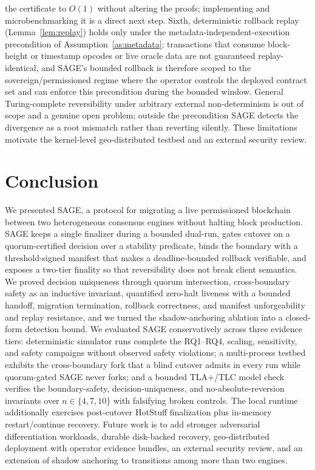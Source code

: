 \documentclass[journal]{IEEEtran}
\theoremstyle{remark}
\begin{document}
the certificate to $O(1)$ without altering the proofs; implementing and microbenchmarking it is a
direct next step. Sixth, deterministic rollback replay (Lemma~\ref{lem:replay}) holds only under
the metadata-independent-execution precondition of Assumption~\ref{as:metadata}; transactions that
consume block-height or timestamp opcodes or live oracle data are not guaranteed replay-identical,
and SAGE's bounded rollback is therefore scoped to the sovereign/permissioned regime where the
operator controls the deployed contract set and can enforce this precondition during the bounded
window. General Turing-complete reversibility under arbitrary external non-determinism is out of
scope and a genuine open problem; outside the precondition SAGE detects the divergence as a root
mismatch rather than reverting silently. These limitations motivate the kernel-level geo-distributed
testbed and an external security review.

\section{Conclusion}
\label{sec:conclusion}
We presented SAGE, a protocol for migrating a live permissioned blockchain between two
heterogeneous consensus engines without halting block production. SAGE keeps a single finalizer
during a bounded dual-run, gates cutover on a quorum-certified decision over a stability
predicate, binds the boundary with a threshold-signed manifest that makes a deadline-bounded
rollback verifiable, and exposes a two-tier finality so that reversibility does not break client
semantics. We proved decision uniqueness through quorum intersection, cross-boundary safety as an
inductive invariant, quantified zero-halt liveness with a bounded handoff, migration termination,
rollback correctness, and manifest unforgeability and replay resistance, and we turned the
shadow-anchoring ablation into a closed-form detection bound. We evaluated SAGE
conservatively across three evidence tiers: deterministic simulator runs
complete the RQ1--RQ4, scaling, sensitivity, and safety campaigns without observed
safety violations; a multi-process testbed exhibits the cross-boundary fork that a blind cutover
admits in every run while quorum-gated SAGE never forks; and a bounded TLA+/TLC model check
verifies the boundary-safety, decision-uniqueness, and no-absolute-reversion invariants over
$n\in\{4,7,10\}$ with falsifying broken controls. The local runtime additionally exercises
post-cutover HotStuff finalization plus in-memory restart/continue recovery. Future work is to
add stronger adversarial differentiation workloads, durable disk-backed recovery,
geo-distributed deployment with operator evidence bundles, an external security review, and an
extension of shadow anchoring to transitions among more than two engines.
\end{document}
